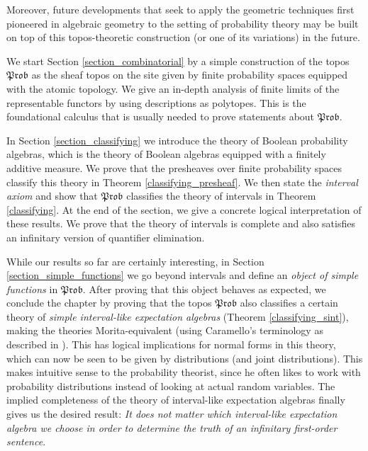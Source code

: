 \documentclass[a4paper]{amsproc}
\theoremstyle{plain}
\theoremstyle{definition}
\theoremstyle{remark}
\numberwithin{equation}{section}
\newcommand{\Prob}{\mathfrak{Prob}}
\begin{document}
Moreover, future developments that seek to apply the geometric techniques first pioneered in algebraic geometry to the setting of probability theory may be built on top of this topos-theoretic construction (or one of its variations) in the future.


We start Section \ref{section_combinatorial} by a simple construction of the topos $\Prob$ as the sheaf topos on the site given by finite probability spaces equipped with the atomic topology. We give an in-depth analysis of finite limits of the representable functors by using descriptions as polytopes. This is the foundational calculus that is usually needed to prove statements about $\Prob$.

In Section \ref{section_classifying} we introduce the theory of Boolean probability algebras, which is the theory of Boolean algebras equipped with a finitely additive measure. We prove that the presheaves over finite probability spaces classify this theory in Theorem \ref{classifying_presheaf}. We then state the \emph{interval axiom} and show that $\Prob$ classifies the theory of intervals in Theorem \ref{classifying}. At the end of the section, we give a concrete logical interpretation of these results. We prove that the theory of intervals is complete and also satisfies an infinitary version of quantifier elimination.

While our results so far are certainly interesting, in Section \ref{section_simple_functions} we go beyond intervals and define an \emph{object of simple functions} in $\Prob$. After proving that this object behaves as expected, we conclude the chapter by proving that the topos $\Prob$ also classifies a certain theory of \emph{simple interval-like expectation algebras} (Theorem \ref{classifying_sint}), making the theories Morita-equivalent (using Caramello's terminology as described in \cite{caramello2018theories}). This has logical implications for normal forms in this theory, which can now be seen to be given by distributions (and joint distributions). This makes intuitive sense to the probability theorist, since he often likes to work with probability distributions instead of looking at actual random variables. The implied completeness of the theory of interval-like expectation algebras finally gives us the desired result: \emph{It does not matter which interval-like expectation algebra we choose in order to determine the truth of an infinitary first-order sentence}.

\end{document}
